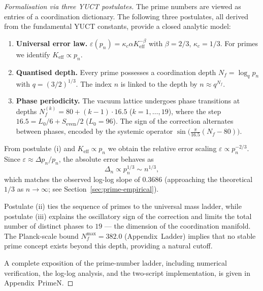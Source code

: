 \documentclass[12pt,a4paper]{article}
\theoremstyle{remark}
\begin{document}
	\begin{proof}[Formalisation via three YUCT postulates]
		The prime numbers are viewed as entries of a coordination dictionary.
		The following three postulates, all derived from the fundamental YUCT
		constants, provide a closed analytic model:
		\begin{enumerate}[label=(\roman*)]
			\item \textbf{Universal error law.} \(\varepsilon(p_n) = \kappa_c \alpha K_{\mathrm{eff}}^{-\beta}\) with \(\beta = 2/3\), \(\kappa_c = 1/3\).  For primes we identify \(K_{\mathrm{eff}} \propto p_n\).
			\item \textbf{Quantised depth.} Every prime possesses a coordination depth \(N_f = \log_q p_n\) with \(q = (3/2)^{1/3}\).  The index \(n\) is linked to the depth by \(n \approx q^{N_f}\).
			\item \textbf{Phase periodicity.} The vacuum lattice undergoes phase transitions at depths \(N_f^{(k)} = 80 + (k-1)\cdot 16.5\) (\(k=1,\dots,19\)), where the step \(16.5 = L_0/6 + S_{\mathrm{even}}/2\) (\(L_0=96\)).  The sign of the correction alternates between phases, encoded by the systemic operator \(\sin\bigl(\frac{\pi}{16.5}(N_f-80)\bigr)\).
		\end{enumerate}
		
		From postulate (i) and \(K_{\mathrm{eff}} \propto p_n\) we obtain the relative error scaling \(\varepsilon \propto p_n^{-2/3}\).  Since \(\varepsilon \approx \Delta p_n / p_n\), the absolute error behaves as
		\[
		\Delta_n \propto p_n^{1/3} \sim n^{1/3},
		\]
		which matches the observed log-log slope of \(0.3686\) (approaching the theoretical \(1/3\) as \(n\to\infty\); see Section~\ref{sec:prime-empirical}).
		
		Postulate (ii) ties the sequence of primes to the universal mass ladder, while postulate (iii) explains the oscillatory sign of the correction and limits the total number of distinct phases to \(19\) --- the dimension of the coordination manifold.  The Planck-scale bound \(N_f^{\max} = 382.0\) (Appendix~Ladder) implies that no stable prime concept exists beyond this depth, providing a natural cutoff.
		
		A complete exposition of the prime-number ladder, including numerical verification, the log-log analysis, and the two-script implementation, is given in Appendix~PrimeN.
	\end{proof}
	
\end{document}
